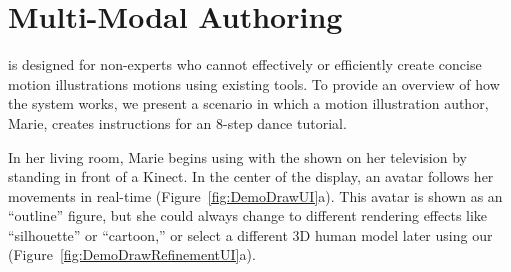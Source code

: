 
\section{Multi-Modal Authoring}

\systemname{} is designed for non-experts who cannot effectively or efficiently create concise motion illustrations motions using existing tools.
To provide an overview of how the system works, we present a scenario in which a motion illustration author, Marie, creates instructions for an 8-step dance tutorial.

In her living room, Marie begins using \systemname{} with the \phaseI{} shown on her television by standing in front of a Kinect. In the center of the display, an avatar follows her movements in real-time (Figure~\ref{fig:DemoDrawUI}a).
This avatar is shown as an ``outline'' figure, but she could always change to different rendering effects like ``silhouette'' or ``cartoon,'' or select a different 3D human model later using our \phaseII{} (Figure~\ref{fig:DemoDrawRefinementUI}a).


